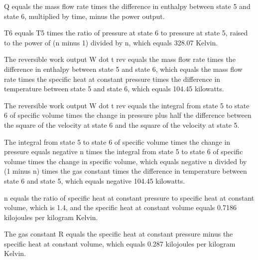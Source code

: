 Q equals the mass flow rate times the difference in enthalpy between state 5 and state 6, multiplied by time, minus the power output.

T6 equals T5 times the ratio of pressure at state 6 to pressure at state 5, raised to the power of (n minus 1) divided by n, which equals 328.07 Kelvin.

The reversible work output W dot t rev equals the mass flow rate times the difference in enthalpy between state 5 and state 6, which equals the mass flow rate times the specific heat at constant pressure times the difference in temperature between state 5 and state 6, which equals 104.45 kilowatts.

The reversible work output W dot t rev equals the integral from state 5 to state 6 of specific volume times the change in pressure plus half the difference between the square of the velocity at state 6 and the square of the velocity at state 5.

The integral from state 5 to state 6 of specific volume times the change in pressure equals negative n times the integral from state 5 to state 6 of specific volume times the change in specific volume, which equals negative n divided by (1 minus n) times the gas constant times the difference in temperature between state 6 and state 5, which equals negative 104.45 kilowatts.

n equals the ratio of specific heat at constant pressure to specific heat at constant volume, which is 1.4, and the specific heat at constant volume equals 0.7186 kilojoules per kilogram Kelvin.

The gas constant R equals the specific heat at constant pressure minus the specific heat at constant volume, which equals 0.287 kilojoules per kilogram Kelvin.